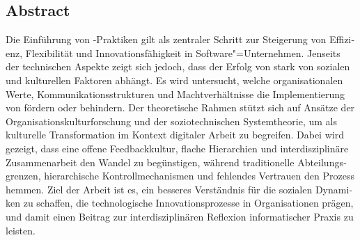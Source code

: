 \begin{otherlanguage}{ngerman}
	\chapter*{Abstract}
	Die Einführung von \DO-Praktiken gilt als zentraler Schritt zur Steigerung von Effizienz, Flexibilität und Innovationsfähigkeit in Software"=Unternehmen. Jenseits der technischen Aspekte zeigt sich jedoch, dass der Erfolg von \DO stark von sozialen und kulturellen Faktoren abhängt. Es wird untersucht, welche organisationalen Werte, Kommunikationsstrukturen und Machtverhältnisse die Implementierung von \DO fördern oder behindern. Der theoretische Rahmen stützt sich auf Ansätze der Organisationskulturforschung und der soziotechnischen Systemtheorie, um \DO als kulturelle Transformation im Kontext digitaler Arbeit zu begreifen. Dabei wird gezeigt, dass eine offene Feedbackkultur, flache Hierarchien und interdisziplinäre Zusammenarbeit den Wandel zu \DO begünstigen, während traditionelle Abteilungsgrenzen, hierarchische Kontrollmechanismen und fehlendes Vertrauen den Prozess hemmen. Ziel der Arbeit ist es, ein besseres Verständnis für die sozialen Dynamiken zu schaffen, die technologische Innovationsprozesse in Organisationen prägen, und damit einen Beitrag zur interdisziplinären Reflexion informatischer Praxis zu leisten.
\end{otherlanguage}
